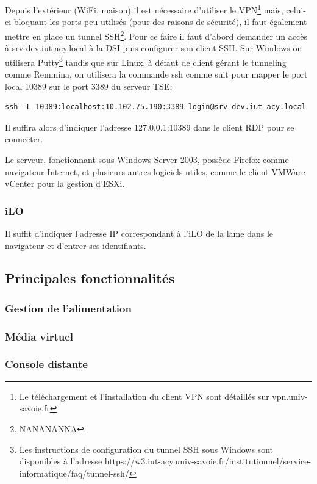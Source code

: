 \documentclass[a4paper,oneside]{report}
\begin{document}
Depuis l'extérieur (WiFi, maison) il est nécessaire d'utiliser le VPN\footnote{Le téléchargement et l'installation du client VPN sont détaillés sur vpn.univ-savoie.fr} mais, celui-ci bloquant les ports peu utilisés (pour des raisons de sécurité), il faut également mettre en place un tunnel SSH\footnote{NANANANNA}.
Pour ce faire il faut d'abord demander un accès à srv-dev.iut-acy.local à la DSI puis configurer son client SSH.\newline
Sur Windows on utilisera Putty\footnote{Les instructions de configuration du tunnel SSH sous Windows sont disponibles à l'adresse https://w3.iut-acy.univ-savoie.fr/institutionnel/service-informatique/faq/tunnel-ssh/} tandis que sur Linux, à défaut de client gérant le tunneling comme Remmina, on utilisera la commande ssh comme suit pour mapper le port local 10389 sur le port 3389 du serveur TSE:
\begin{verbatim}
ssh -L 10389:localhost:10.102.75.190:3389 login@srv-dev.iut-acy.local
\end{verbatim}
Il suffira alors d'indiquer l'adresse 127.0.0.1:10389 dans le client RDP pour se connecter.

Le serveur, fonctionnant sous Windows Server 2003, possède Firefox comme navigateur Internet, et plusieurs autres logiciels utiles, comme le client VMWare vCenter pour la gestion d'ESXi.

\subsubsection{iLO}
Il suffit d'indiquer l'adresse IP correspondant à l'iLO de la lame dans le navigateur et d'entrer ses identifiants.

\subsection{Principales fonctionnalités}
\subsubsection{Gestion de l'alimentation}

\subsubsection{Média virtuel}

\subsubsection{Console distante}
\end{document}
